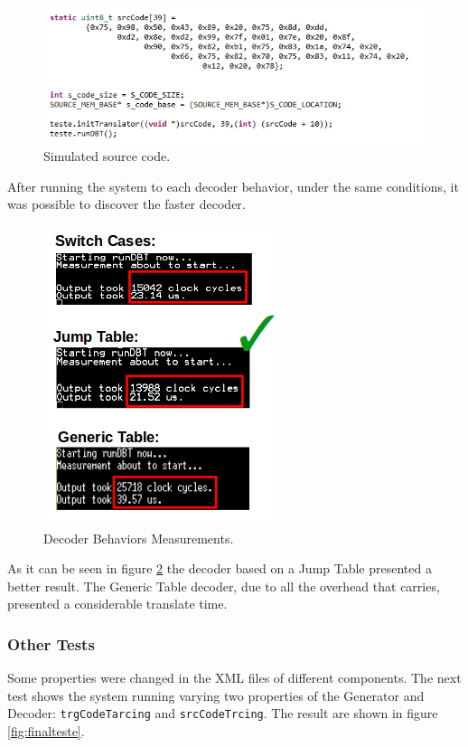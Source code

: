 \begin{figure}[H]
\centerline{
\includegraphics[scale=0.65]{images/sourceCode.png}
}
\caption{Simulated source code.}
\label{fig:SourceCodeDecoderTest}
\end{figure}

After running the system to each decoder behavior, under the same conditions, it was possible to discover the faster decoder.

\begin{figure}[H]
\centerline{
\includegraphics[scale=0.67]{images/DecoderBehaviorsResults}
}
\caption{Decoder Behaviors Measurements.}
\label{fig:DecoderBehaviorsMeasurements}
\end{figure}

As it can be seen in figure \ref{fig:DecoderBehaviorsMeasurements} the decoder based on a Jump Table presented a better result. The Generic Table decoder, due to all the overhead that carries, presented a considerable translate time.

\subsubsection{Other Tests}
Some properties were changed in the XML files of different components. The next test shows the system running varying two properties of the Generator and Decoder: \texttt{trgCodeTarcing} and \texttt{srcCodeTrcing}. The result are shown in figure \ref{fig:finalteste}.

